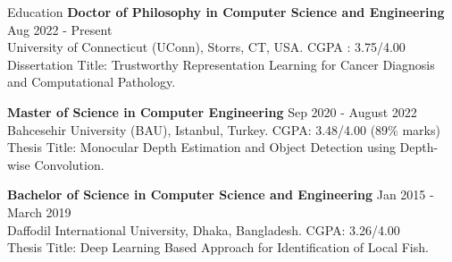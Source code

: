 \begin{rSection}{Education}
{\bf Doctor of Philosophy in Computer Science and Engineering} \hfill { Aug 2022 - Present}
\\ 
University of Connecticut (UConn), Storrs, CT, USA. 
CGPA : 3.75/4.00 \\
Dissertation Title: Trustworthy Representation Learning for Cancer Diagnosis and Computational Pathology.%

{\bf Master of Science in Computer Engineering} \hfill { Sep 2020 - August 2022}
\\ 
Bahcesehir University (BAU), Istanbul, Turkey. 
CGPA: 3.48/4.00 (89\% marks)\\
Thesis Title: Monocular Depth Estimation and Object Detection using Depth-wise Convolution.

{\bf Bachelor of Science in Computer Science and Engineering} \hfill { Jan 2015 - March 2019}
\\ 
Daffodil International University, Dhaka, Bangladesh.
CGPA: 3.26/4.00 \\
Thesis Title: Deep Learning Based Approach for Identification of Local Fish.

\end{rSection}

    



